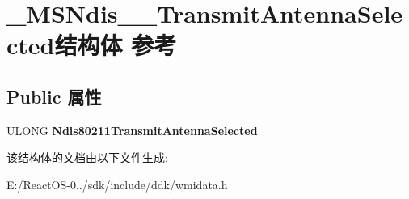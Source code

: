 \hypertarget{struct___m_s_ndis__80211___transmit_antenna_selected}{}\section{\+\_\+\+M\+S\+Ndis\+\_\+\_\+\+Transmit\+Antenna\+Selected结构体 参考}
\label{struct___m_s_ndis__80211___transmit_antenna_selected}
\subsection*{Public 属性}
\begin{DoxyCompactItemize}
\item 
\mbox{\label{struct___m_s_ndis__80211___transmit_antenna_selected_a7fcdcca12f121a5ebcf45e434e7506f5}} 
U\+L\+O\+NG {\bfseries Ndis80211\+Transmit\+Antenna\+Selected}
\end{DoxyCompactItemize}


该结构体的文档由以下文件生成\+:\begin{DoxyCompactItemize}
\item 
E\+:/\+React\+O\+S-\/0../sdk/include/ddk/wmidata.\+h\end{DoxyCompactItemize}
